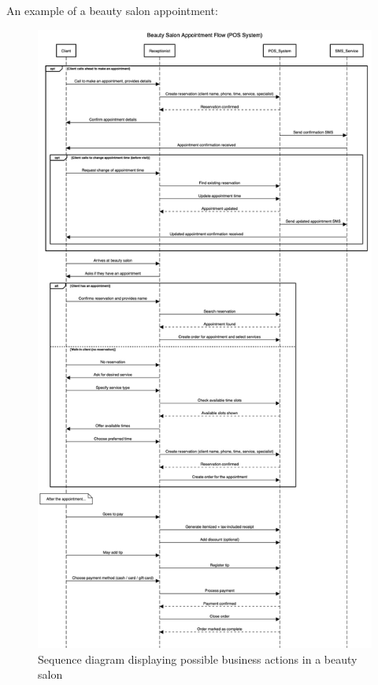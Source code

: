 \documentclass[11pt,a4paper,pdftex]{article}
\begin{document}
An example of a beauty salon appointment:

\begin{figure}[H]
    \centering
    \includegraphics[scale=0.22]{graphics/beauty salon.png}
    \caption{Sequence diagram displaying possible business actions in a beauty salon}
    \label{figures:sequence_beauty_salon}
\end{figure}
\end{document}
